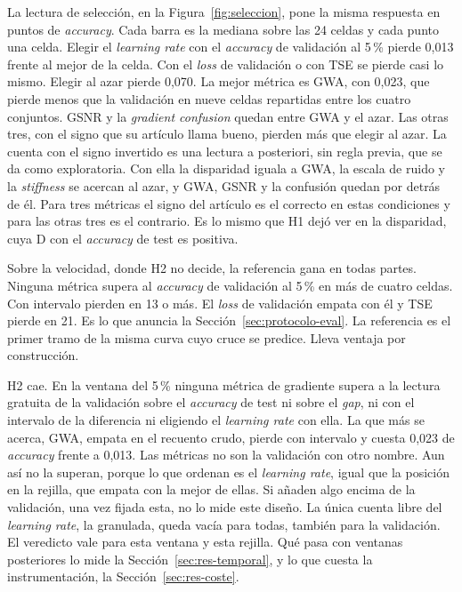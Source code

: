 La lectura de selección, en la Figura~\ref{fig:seleccion}, pone la misma respuesta en puntos de \emph{accuracy}. Cada barra es la mediana sobre las 24 celdas y cada punto una celda. Elegir el \emph{learning rate} con el \emph{accuracy} de validación al 5\,\% pierde 0,013 frente al mejor de la celda. Con el \emph{loss} de validación o con TSE se pierde casi lo mismo. Elegir al azar pierde 0,070. La mejor métrica es GWA, con 0,023, que pierde menos que la validación en nueve celdas repartidas entre los cuatro conjuntos. GSNR y la \emph{gradient confusion} quedan entre GWA y el azar. Las otras tres, con el signo que su artículo llama bueno, pierden más que elegir al azar. La cuenta con el signo invertido es una lectura a posteriori, sin regla previa, que se da como exploratoria. Con ella la disparidad iguala a GWA, la escala de ruido y la \emph{stiffness} se acercan al azar, y GWA, GSNR y la confusión quedan por detrás de él. Para tres métricas el signo del artículo es el correcto en estas condiciones y para las otras tres es el contrario. Es lo mismo que H1 dejó ver en la disparidad, cuya D con el \emph{accuracy} de test es positiva.

Sobre la velocidad, donde H2 no decide, la referencia gana en todas partes. Ninguna métrica supera al \emph{accuracy} de validación al 5\,\% en más de cuatro celdas. Con intervalo pierden en 13 o más. El \emph{loss} de validación empata con él y TSE pierde en 21. Es lo que anuncia la Sección~\ref{sec:protocolo-eval}. La referencia es el primer tramo de la misma curva cuyo cruce se predice. Lleva ventaja por construcción.

H2 cae. En la ventana del 5\,\% ninguna métrica de gradiente supera a la lectura gratuita de la validación sobre el \emph{accuracy} de test ni sobre el \emph{gap}, ni con el intervalo de la diferencia ni eligiendo el \emph{learning rate} con ella. La que más se acerca, GWA, empata en el recuento crudo, pierde con intervalo y cuesta 0,023 de \emph{accuracy} frente a 0,013. Las métricas no son la validación con otro nombre. Aun así no la superan, porque lo que ordenan es el \emph{learning rate}, igual que la posición en la rejilla, que empata con la mejor de ellas. Si añaden algo encima de la validación, una vez fijada esta, no lo mide este diseño. La única cuenta libre del \emph{learning rate}, la granulada, queda vacía para todas, también para la validación. El veredicto vale para esta ventana y esta rejilla. Qué pasa con ventanas posteriores lo mide la Sección~\ref{sec:res-temporal}, y lo que cuesta la instrumentación, la Sección~\ref{sec:res-coste}.

